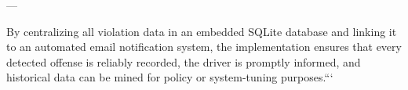 ---

By centralizing all violation data in an embedded SQLite database and linking it to an automated email notification system, the implementation ensures that every detected offense is reliably recorded, the driver is promptly informed, and historical data can be mined for policy or system-tuning purposes.```



